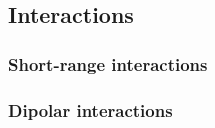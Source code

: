 \documentclass[a4paper, 12pt]{article}
\def\buildMode{buildmissing}
\begin{document}
\begin{landscape}
        \subsection{Interactions}

            \subsubsection{Short-range interactions}
            \begin{figure}[htb]
                \centering
                
                \caption{}
            \end{figure}

    \end{landscape}
        \clearpage
        \thispagestyle{empty}
        \recalctypearea

            \subsubsection{Dipolar interactions}
            \begin{figure}[htb]
                \centering
                
                \caption{}
            \end{figure}

        \clearpage
        \restoregeometry
        \recalctypearea
\end{document}
